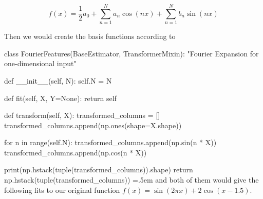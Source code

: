 \documentclass{article}
\theoremstyle{definition}
\newenvironment{cverbatim}
    {\SaveVerbatim{cverb}}
    {\endSaveVerbatim
    \flushleft\fboxrule=0pt\fboxsep=.5em
    \colorbox{cverbbg}{%
      \makebox[\dimexpr\linewidth-2\fboxsep][l]{\BUseVerbatim{cverb}}%
    }
    \endflushleft
  }
\begin{document}
      \[f(x) = \frac{1}{2} a_0 + \sum_{n=1}^N a_n \cos(n x) + \sum_{n=1}^N b_n \sin(n x)\]

    Then we would create the basis functions according to 

    \begin{cverbatim}
    class FourierFeatures(BaseEstimator, TransformerMixin): 
        "Fourier Expansion for one-dimensional input"
        
        def __init__(self, N): 
            self.N = N 
            
        def fit(self, X, Y=None): 
            return self
        
        def transform(self, X): 
            transformed_columns = [] 
            transformed_columns.append(np.ones(shape=X.shape))
            
            for n in range(self.N): 
                transformed_columns.append(np.sin(n * X))
                transformed_columns.append(np.cos(n * X))
                
            print(np.hstack(tuple(transformed_columns)).shape)
            return np.hstack(tuple(transformed_columns))
    \end{cverbatim} 
    and both of them would give the following fits to our original function $f(x) = \sin(2\pi x) + 2 \cos(x - 1.5)$. 
\end{document}
